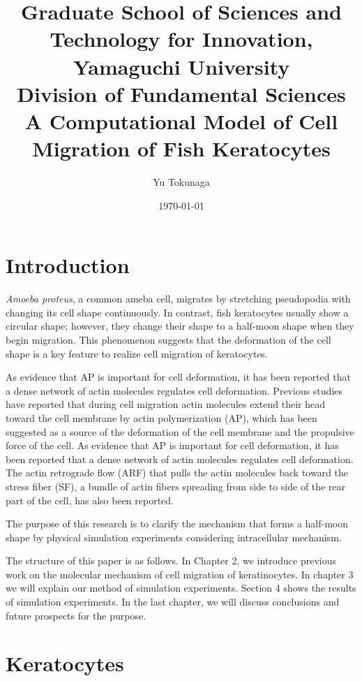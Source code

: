 \documentclass[a4paper,12pt, oneside]{book}
\title{\Large Graduate School of Sciences and Technology for Innovation, Yamaguchi University\\[1cm]
Division of Fundamental Sciences\\[3cm]
\huge A Computational Model of Cell Migration of Fish Keratocytes\\[5cm]
}
\author{Yu Tokunaga}
\date{\Large \today}
\begin{document}
\maketitle
\setcounter{page}{1}
\tableofcontents
\chapter{Introduction}
\setcounter{page}{1}
{\it Amoeba proteus},  a common ameba cell, migrates by stretching pseudopodia with changing  its cell shape continuously.
In contrast, fish keratocytes usually show a circular shape; however, they change their shape to a half-moon shape when they begin migration. This phenomenon suggests that the deformation of the cell shape is a key feature to realize cell migration of keratocytes.

As evidence that AP is important for cell deformation, it has been reported that a dense network of actin molecules regulates cell deformation\cite{svitkina1997analysis}.
Previous studies have reported that during cell migration actin molecules extend their head toward the cell membrane by actin polymerization (AP), which has been suggested as a source of the deformation of the cell membrane and the propulsive force of the cell.
As evidence that AP is important for cell deformation, it has been reported that a dense network of actin molecules regulates cell deformation.
The actin retrograde flow (ARF) that pulls the actin molecules back toward the stress fiber (SF), a bundle of actin fibers spreading from side to side of the rear part of the cell, has also been reported\cite{nakashima2015molecular}.

The purpose of this research is to clarify the mechanism that forms a half-moon shape by physical simulation experiments considering intracellular mechanism.

The structure of this paper is as follows. In Chapter 2, we introduce previous work on the molecular mechanism of cell migration of keratinocytes. In chapter 3 we will explain our method of simulation experiments. Section 4 shows the results of simulation experiments. In the last chapter, we will discuss conclusions and future prospects for the purpose.


\chapter{Keratocytes}
\end{document}
